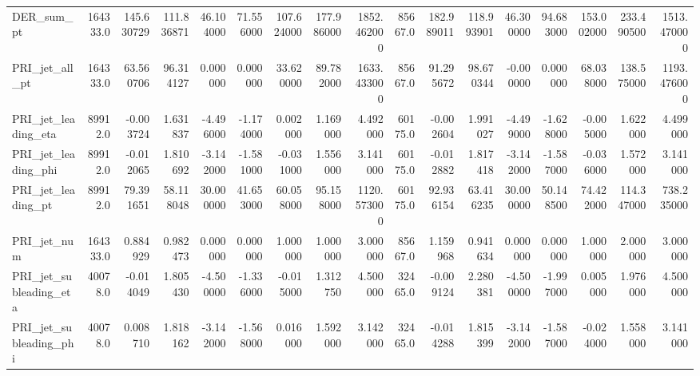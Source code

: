 \begin{table}[ht]
\begin{tabular}{lrrrrrrrrrrrrrrrr}
		DER\_sum\_pt                  &  164333.0 &     145.630729 &    111.836871 &      46.104000 &      71.556000 &     107.624000 &     177.986000 &    1852.462000 &  85667.0 &     182.989011 &    118.993901 &      46.300000 &      94.683000 &     153.002000 &     233.490500 &    1513.470000 \\
		PRI\_jet\_all\_pt              &  164333.0 &      63.560706 &     96.314127 &       0.000000 &       0.000000 &      33.620000 &      89.782000 &    1633.433000 &  85667.0 &      91.295672 &     98.670344 &      -0.000000 &       0.000000 &      68.038000 &     138.575000 &    1193.476000 \\
		PRI\_jet\_leading\_eta         &   89912.0 &      -0.003724 &      1.631837 &      -4.496000 &      -1.174000 &       0.002000 &       1.169000 &       4.492000 &  60175.0 &      -0.002604 &      1.991027 &      -4.499000 &      -1.628000 &      -0.005000 &       1.622000 &       4.499000 \\
		PRI\_jet\_leading\_phi         &   89912.0 &      -0.012065 &      1.810692 &      -3.142000 &      -1.581000 &      -0.031000 &       1.556000 &       3.141000 &  60175.0 &      -0.012882 &      1.817418 &      -3.142000 &      -1.587000 &      -0.036000 &       1.572000 &       3.141000 \\
		PRI\_jet\_leading\_pt          &   89912.0 &      79.391651 &     58.118048 &      30.000000 &      41.653000 &      60.058000 &      95.158000 &    1120.573000 &  60175.0 &      92.936154 &     63.416235 &      30.000000 &      50.148500 &      74.422000 &     114.347000 &     738.235000 \\
		PRI\_jet\_num                 &  164333.0 &       0.884929 &      0.982473 &       0.000000 &       0.000000 &       1.000000 &       1.000000 &       3.000000 &  85667.0 &       1.159968 &      0.941634 &       0.000000 &       0.000000 &       1.000000 &       2.000000 &       3.000000 \\
		PRI\_jet\_subleading\_eta      &   40078.0 &      -0.014049 &      1.805430 &      -4.500000 &      -1.336000 &      -0.015000 &       1.312750 &       4.500000 &  32465.0 &      -0.009124 &      2.280381 &      -4.500000 &      -1.997000 &       0.005000 &       1.976000 &       4.500000 \\
		PRI\_jet\_subleading\_phi      &   40078.0 &       0.008710 &      1.818162 &      -3.142000 &      -1.568000 &       0.016000 &       1.592000 &       3.142000 &  32465.0 &      -0.014288 &      1.815399 &      -3.142000 &      -1.587000 &      -0.024000 &       1.558000 &       3.141000 \\

\end{tabular}
\end{table}
